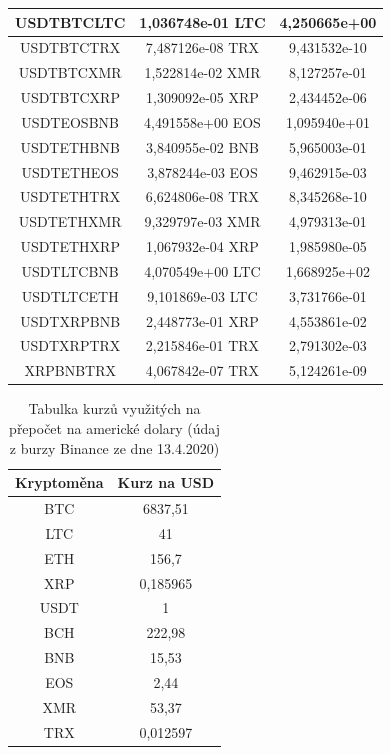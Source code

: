 \documentclass[thesis=B,czech]{FITthesis}[2019/03/21]
\begin{document}
\begin{table}
\begin{tabular}{|| c | c | c ||}
 \hline USDTBTCLTC & 1,036748e-01 LTC & 4,250665e+00\\ 
 \hline USDTBTCTRX & 7,487126e-08 TRX & 9,431532e-10\\ 
 \hline USDTBTCXMR & 1,522814e-02 XMR & 8,127257e-01\\ 
 \hline USDTBTCXRP & 1,309092e-05 XRP & 2,434452e-06\\ 
 \hline USDTEOSBNB & 4,491558e+00 EOS & 1,095940e+01\\ 
 \hline USDTETHBNB & 3,840955e-02 BNB & 5,965003e-01\\ 
 \hline USDTETHEOS & 3,878244e-03 EOS & 9,462915e-03\\ 
 \hline USDTETHTRX & 6,624806e-08 TRX & 8,345268e-10\\ 
 \hline USDTETHXMR & 9,329797e-03 XMR & 4,979313e-01\\ 
 \hline USDTETHXRP & 1,067932e-04 XRP & 1,985980e-05\\ 
 \hline USDTLTCBNB & 4,070549e+00 LTC & 1,668925e+02\\ 
 \hline USDTLTCETH & 9,101869e-03 LTC & 3,731766e-01\\ 
 \hline USDTXRPBNB & 2,448773e-01 XRP & 4,553861e-02\\ 
 \hline USDTXRPTRX & 2,215846e-01 TRX & 2,791302e-03\\ 
 \hline XRPBNBTRX & 4,067842e-07 TRX & 5,124261e-09\\ 
 \hline
\end{tabular}
\end{table}

\begin{table}\centering
\caption{Tabulka kurzů využitých na přepočet na americké dolary (údaj z burzy Binance ze dne 13.4.2020)}
\label{table_rates}
\begin{tabular}{|| c | c ||}
\hline Kryptoměna & Kurz na USD \\ 
\hline\hline BTC & 6837,51 \\ 
\hline LTC & 41 \\ 
\hline ETH & 156,7 \\ 
\hline XRP & 0,185965 \\ 
\hline USDT & 1 \\ 
\hline BCH & 222,98 \\ 
\hline BNB & 15,53 \\ 
\hline EOS & 2,44 \\ 
\hline XMR & 53,37 \\ 
\hline TRX & 0,012597 \\ 
\hline
\end{tabular}
\end{table}
\end{document}
